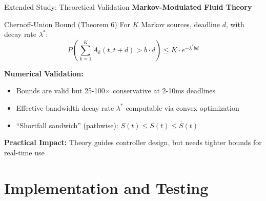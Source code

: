 \documentclass[aspectratio=169]{beamer}
\begin{document}
\begin{frame}{Extended Study: Theoretical Validation}
\textbf{Markov-Modulated Fluid Theory}

\begin{block}{Chernoff-Union Bound (Theorem 6)}
For $K$ Markov sources, deadline $d$, with decay rate $\lambda^*$:
\vspace{-0.3cm}
\begin{equation*}
P\left(\sum_{k=1}^K A_k(t, t+d) > b \cdot d\right) \leq K \cdot e^{-\lambda^* b d}
\end{equation*}
\end{block}

\textbf{Numerical Validation:}
\begin{itemize}
    \item Bounds are valid but 25-100× conservative at 2-10ms deadlines
    \item Effective bandwidth decay rate $\lambda^*$ computable via convex optimization
    \item ``Shortfall sandwich'' (pathwise): $\underline{S}(t) \leq S(t) \leq \overline{S}(t)$
\end{itemize}

\vspace{0.3cm}
\textbf{Practical Impact:} Theory guides controller design, but needs tighter bounds for real-time use
\end{frame}

\section{Implementation and Testing}
\end{document}
